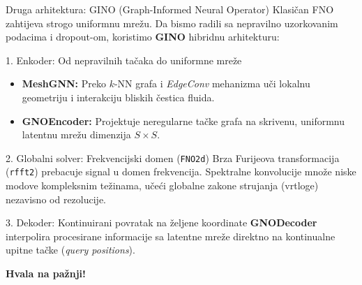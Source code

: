 \documentclass[10pt,aspectratio=169]{beamer}
\begin{document}
\begin{frame}{Druga arhitektura: GINO (Graph-Informed Neural Operator)}
  \small
  Klasičan FNO zahtijeva strogo uniformnu mrežu. Da bismo radili sa nepravilno uzorkovanim podacima i dropout-om, koristimo \textbf{GINO} hibridnu arhitekturu:
  
  \vfill
  \begin{block}{1. Enkoder: Od nepravilnih tačaka do uniformne mreže}
    \begin{itemize}
      \item \textbf{MeshGNN:} Preko $k$-NN grafa i \emph{EdgeConv} mehanizma uči lokalnu geometriju i interakciju bliskih čestica fluida.
      \item \textbf{GNOEncoder:} Projektuje neregularne tačke grafa na skrivenu, uniformnu latentnu mrežu dimenzija $S \times S$.
    \end{itemize}
  \end{block}

  \begin{block}{2. Globalni solver: Frekvencijski domen (\texttt{FNO2d})}
    Brza Furijeova transformacija (\texttt{rfft2}) prebacuje signal u domen frekvencija. Spektralne konvolucije množe niske modove kompleksnim težinama, učeći globalne zakone strujanja (vrtloge) nezavisno od rezolucije.
  \end{block}

  \begin{block}{3. Dekoder: Kontinuirani povratak na željene koordinate}
    \textbf{GNODecoder} interpolira procesirane informacije sa latentne mreže direktno na kontinualne upitne tačke (\emph{query positions}).
  \end{block}
\end{frame}


\begin{frame}
  \centering
  \vfill
  \Huge \textbf{Hvala na pažnji!}
  \vfill  
\end{frame}
\end{document}
